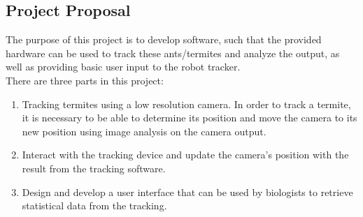 
\subsection{Project Proposal}


The purpose of this project is to develop software, such that the provided hardware can be used to track these ants/termites and analyze the output, as well as providing basic user input to the robot tracker. \\

There are three parts in this project:  

\begin{enumerate}
\item Tracking termites using a low resolution camera. In order to track a termite, it is necessary to be able to determine its position and move the camera to its new position using image analysis on the camera output. 

\item Interact with the tracking device and update the camera's position with the result from the tracking software. 

\item Design and develop a user interface that can be used by biologists to retrieve statistical data from the tracking.  
\end{enumerate}